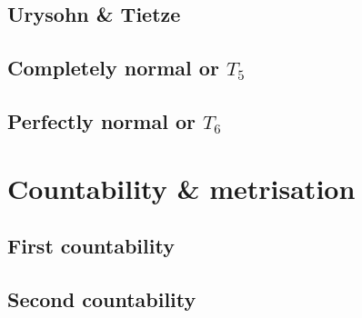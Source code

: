 \documentclass[a4paper,nobib,nols]{tufte-book}
\begin{document}
\section{Urysohn \& Tietze}%
\label{sec:urysohn_tietze}

\section{Completely normal or $T_5$}%
\label{sec:completely_normal_or_t5}

\section{Perfectly normal or $T_6$}%
\label{sec:perfectly_normal_or_t6}

\chapter{Countability \& metrisation}%
\label{cha:countability_metrisation}

\section{First countability}%
\label{sec:first_countability}

\section{Second countability}%
\label{sec:second_countability}

\end{document}
